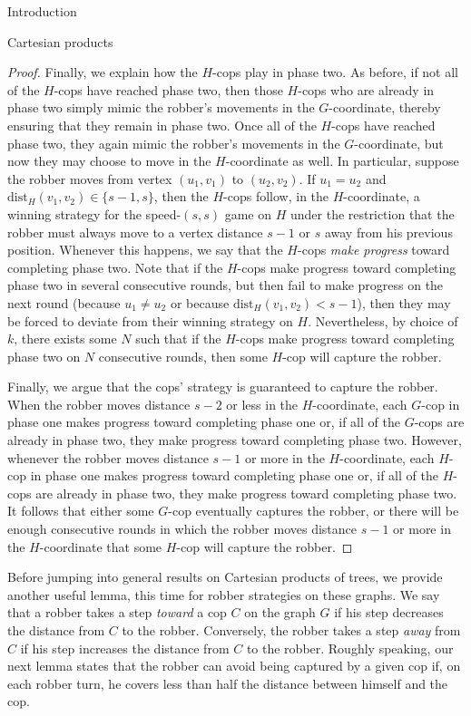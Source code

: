 \documentclass[12pt]{amsart}
\theoremstyle{definition}
\begin{document}
\begin{section}{Introduction}
\begin{section}{Cartesian products}
\begin{proof}
Finally, we explain how the $H$-cops play in phase two.  As before, if not all of the $H$-cops have reached phase two, then those $H$-cops who are already in phase two simply mimic the robber's movements in the $G$-coordinate, thereby ensuring that they remain in phase two.  Once all of the $H$-cops have reached phase two, they again mimic the robber's movements in the $G$-coordinate, but now they may choose to move in the $H$-coordinate as well.  In particular, suppose the robber moves from vertex $(u_1, v_1)$ to $(u_2, v_2)$.  If $u_1 = u_2$ and $\textrm{dist}_H(v_1,v_2) \in \{s-1, s\}$, then the $H$-cops follow, in the $H$-coordinate, a winning strategy for the speed-$(s,s)$ game on $H$ under the restriction that the robber must always move to a vertex distance $s-1$ or $s$ away from his previous position.  Whenever this happens, we say that the $H$-cops \textit{make progress} toward completing phase two.  Note that if the $H$-cops make progress toward completing phase two in several consecutive rounds, but then fail to make progress on the next round (because $u_1 \not = u_2$ or because $\textrm{dist}_H(v_1,v_2) < s-1$), then they may be forced to deviate from their winning strategy on $H$.  Nevertheless, by choice of $k$, there exists some $N$ such that if the $H$-cops make progress toward completing phase two on $N$ consecutive rounds, then some $H$-cop will capture the robber.

Finally, we argue that the cops' strategy is guaranteed to capture the robber.  When the robber moves distance $s-2$ or less in the $H$-coordinate, each $G$-cop in phase one makes progress toward completing phase one or, if all of the $G$-cops are already in phase two, they make progress toward completing phase two.  However, whenever the robber moves distance $s-1$ or more in the $H$-coordinate, each $H$-cop in phase one makes progress toward completing phase one or, if all of the $H$-cops are already in phase two, they make progress toward completing phase two.  It follows that either some $G$-cop eventually captures the robber, or there will be enough consecutive rounds in which the robber moves distance $s-1$ or more in the $H$-coordinate that some $H$-cop will capture the robber.
\end{proof}

Before jumping into general results on Cartesian products of trees, we provide another useful lemma, this time for robber strategies on these graphs.  We say that a robber takes a step \textit{toward} a cop $C$ on the graph $G$ if his step decreases the distance from $C$ to the robber.  Conversely, the robber takes a step \textit{away} from $C$ if his step increases the distance from $C$ to the robber.  Roughly speaking, our next lemma states that the robber can avoid being captured by a given cop if, on each robber turn, he covers less than half the distance between himself and the cop.


\end{section}
\end{section}
\end{document}
